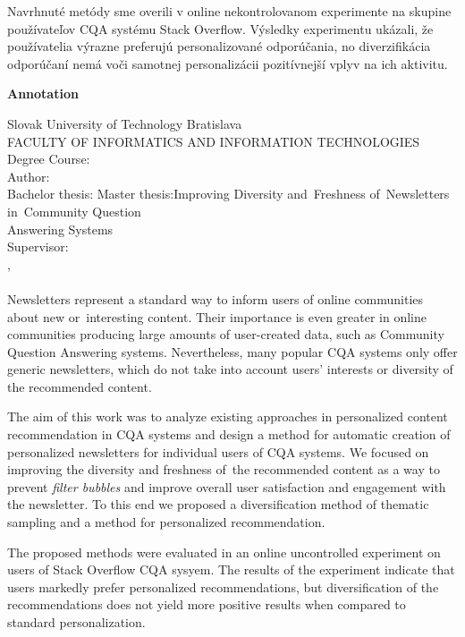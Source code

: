Navrhnuté metódy sme overili v online nekontrolovanom experimente na skupine používateľov CQA systému Stack Overflow.
Výsledky experimentu ukázali, že používatelia výrazne preferujú personalizované odporúčania, no diverzifikácia
odporúčaní nemá voči samotnej personalizácii pozitívnejší vplyv na ich aktivitu.

\afterpage{\blankpage}
\newpage
\thispagestyle{plain}
\begin{center}
\begin{Large}
\textbf{Annotation} \\
\end{Large}
\end{center}
Slovak University of Technology Bratislava
\vspace*{2mm}\\FACULTY OF INFORMATICS AND INFORMATION TECHNOLOGIES
\vspace*{2mm}\\
\noindent
Degree Course:~\ProgramEN
\vspace*{2mm}\\
\noindent
Author:\hspace*{14.5mm}\AuthorEN
\vspace*{2mm}\\
{
	{Bachelor thesis: }\TitleEN
}
{
	{Master thesis:\hspace*{4mm}}Improving Diversity and~Freshness of~Newsletters in~Community Question\\
    \hspace*{27.5mm}Answering Systems
}
\vspace*{2mm}\\
Supervisor: \hspace*{7mm}\SupervisorEN
\vspace*{2mm}\\\Year, \MonthEN\\
\noindent
\\
Newsletters represent a standard way to inform users of online communities about new or~interesting content.
Their importance is even greater in online communities producing large amounts of user-created data, such as
Community Question Answering systems.
Nevertheless, many popular CQA systems only offer generic newsletters, which do not take into account users’ interests
or diversity of the recommended content.

The aim of this work was to analyze existing approaches in personalized content recommendation in CQA systems and design a method for automatic
creation of personalized newsletters for individual users of CQA systems. We focused on improving the diversity and freshness of~the
recommended content as a way to prevent \emph{filter bubbles} and improve overall user satisfaction and engagement with the newsletter.
To this end we proposed a diversification method of thematic sampling and a method for personalized recommendation.

The proposed methods were evaluated in an online uncontrolled experiment on users of Stack Overflow CQA sysyem.
The results of the experiment indicate that users markedly prefer personalized recommendations, but diversification
of the recommendations does not yield more positive results when compared to standard personalization.
\afterpage{\blankpage}
